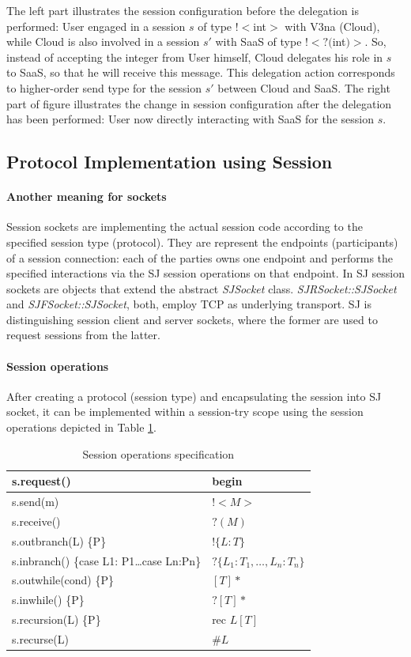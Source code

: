 \documentclass[a4paper]{easychair}
\begin{document}
The left part illustrates the session configuration before the delegation is performed: User engaged in a session $s$ of type $!<$int$>$ with V3na (Cloud), while Cloud is also involved in a session $s'$ with SaaS of type $!<?($int$)>$. So, instead of accepting the integer from User himself, Cloud delegates his role in $s$ to SaaS, so that he will receive this message. This delegation action corresponds to higher-order send type for the session $s'$ between Cloud and SaaS. The right part of figure illustrates the change in session configuration after the delegation has been performed: User now directly interacting with SaaS for the session $s$.

\subsection{Protocol Implementation using Session}
\paragraph{Another meaning for sockets}
Session sockets are implementing the actual session code according to the specified session type (protocol). They are represent the endpoints (participants) of a session connection: each of the parties owns one endpoint and performs the specified interactions via the SJ session operations on that endpoint. In SJ session sockets are objects that extend the abstract \textit{SJSocket} class. \textit{SJRSocket::SJSocket} and \textit{SJFSocket::SJSocket}, both, employ TCP as underlying transport. SJ is distinguishing session client and server sockets, where the former are used to request sessions from the latter.

\paragraph{Session operations}
After creating a protocol (session type) and encapsulating the session into SJ socket, it can be implemented within a session-try scope using the session operations depicted in Table \ref{tab:session-ops}.

\begin{longtable}{|p{}|p{}|}
\caption{Session operations specification}\label{tab:session-ops}\\ \hline
s.request() & begin \\ \hline 
s.send(m) & $!<M>$ \\ \hline
s.receive() & $?(M)$ \\ \hline
s.outbranch(L) \{P\} & $!\{L:T\}$ \\ \hline
s.inbranch() \{case L1: {P1}\dots case Ln:{Pn}\} & $?\{L_1:T_1,\dots, L_n:T_n\}$ \\ \hline
s.outwhile(cond) \{P\} & $[T]*$ \\ \hline
s.inwhile() \{P\} & $?[T]*$ \\ \hline
s.recursion(L) \{P\} & rec $L[T]$ \\ \hline
s.recurse(L) & $\#L$ \\ \hline
\end{longtable}
\end{document}
